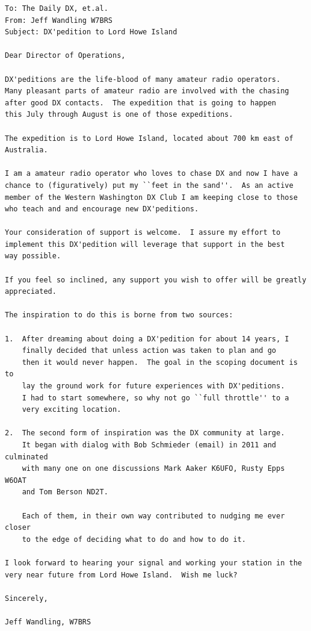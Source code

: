 \documentclass[11pt]{article}
\begin{document}
\begin{Verbatim}[fontsize=\small]
To: The Daily DX, et.al.
From: Jeff Wandling W7BRS
Subject: DX'pedition to Lord Howe Island

Dear Director of Operations,

DX'peditions are the life-blood of many amateur radio operators.
Many pleasant parts of amateur radio are involved with the chasing
after good DX contacts.  The expedition that is going to happen
this July through August is one of those expeditions.

The expedition is to Lord Howe Island, located about 700 km east of Australia.

I am a amateur radio operator who loves to chase DX and now I have a 
chance to (figuratively) put my ``feet in the sand''.  As an active
member of the Western Washington DX Club I am keeping close to those
who teach and and encourage new DX'peditions.

Your consideration of support is welcome.  I assure my effort to 
implement this DX'pedition will leverage that support in the best
way possible.

If you feel so inclined, any support you wish to offer will be greatly
appreciated.

The inspiration to do this is borne from two sources:

1.  After dreaming about doing a DX'pedition for about 14 years, I
    finally decided that unless action was taken to plan and go
    then it would never happen.  The goal in the scoping document is to 
    lay the ground work for future experiences with DX'peditions.  
    I had to start somewhere, so why not go ``full throttle'' to a 
    very exciting location.

2.  The second form of inspiration was the DX community at large.
    It began with dialog with Bob Schmieder (email) in 2011 and culminated
    with many one on one discussions Mark Aaker K6UFO, Rusty Epps W6OAT
    and Tom Berson ND2T.

    Each of them, in their own way contributed to nudging me ever closer 
    to the edge of deciding what to do and how to do it.

I look forward to hearing your signal and working your station in the
very near future from Lord Howe Island.  Wish me luck?

Sincerely,

Jeff Wandling, W7BRS
\end{Verbatim}

\newpage
\printglossary
\newpage
{}
\printindex
\end{document}
